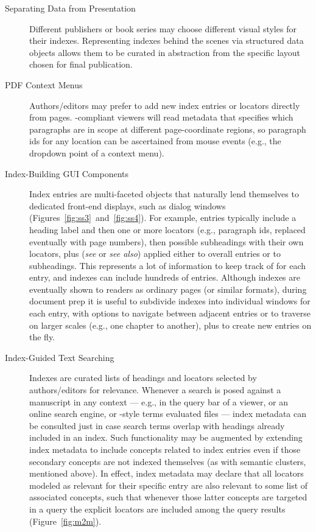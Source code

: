 \documentclass[11pt]{article}
\begin{document}
{{\begin{description}
\item[Separating Data from Presentation]  Different publishers 
or book series may choose different visual styles for their 
indexes.  Representing indexes behind the scenes via structured 
data objects allows them to be curated in abstraction from the 
specific layout chosen for final publication.  

\vspace{-3pt}

\item[PDF Context Menus]  Authors/editors may prefer to add new index entries 
or locators directly from \PDF{} pages.  \lPacTk{}-compliant 
viewers will read metadata that specifies which paragraphs are 
in scope at different page-coordinate regions, so paragraph ids 
for any location can be ascertained from mouse events (e.g., 
the dropdown point of a context menu).

\vspace{-3pt}

\item[Index-Building GUI Components]  Index entries are multi-faceted 
objects that naturally lend themselves to dedicated front-end displays, 
such as dialog windows (Figures~\ref{fig:ss3}~and~\ref{fig:ss4}).  
For example, entries typically include a heading 
label and then one or more locators (e.g., paragraph ids, replaced 
eventually with page numbers), 
then possible subheadings with their own 
locators, plus  (\textit{see} or \textit{see also}) applied 
either to overall entries or to subheadings.  This represents a lot 
of information to keep track of for each entry, and indexes can include 
hundreds of entries.  Although indexes are eventually shown 
to readers as ordinary \PDF{} pages (or similar formats), 
during document prep it is useful to subdivide indexes into 
individual \GUI{} windows for each entry, with options to 
navigate between adjacent entries or to traverse on larger 
scales (e.g., one chapter to another), plus to create new 
entries on the fly.

\vspace{-3pt}

\item[Index-Guided Text Searching]  Indexes are curated lists 
of headings and locators selected by authors/editors for 
relevance.  Whenever a search is posed against a manuscript in 
any context --- e.g., in the query bar of a \PDF{} viewer, or 
an online search engine, or \XQuery{}-style terms evaluated 
\visavis{} \JATS{} files --- index metadata can be consulted 
just in case search terms overlap with headings already included 
in an index.  Such functionality may be augmented by extending 
index metadata to include concepts related to index entries 
even if those secondary concepts are not indexed themselves 
(as with semantic clusters, mentioned above).
In effect, index metadata may declare that all locators 
modeled as relevant for their specific entry are also relevant 
to some list of associated concepts, such that whenever those 
latter concepts are targeted in a query the explicit 
locators are included among the query results (Figure~\ref{fig:m2m}).   


\end{description}}}
\end{document}
